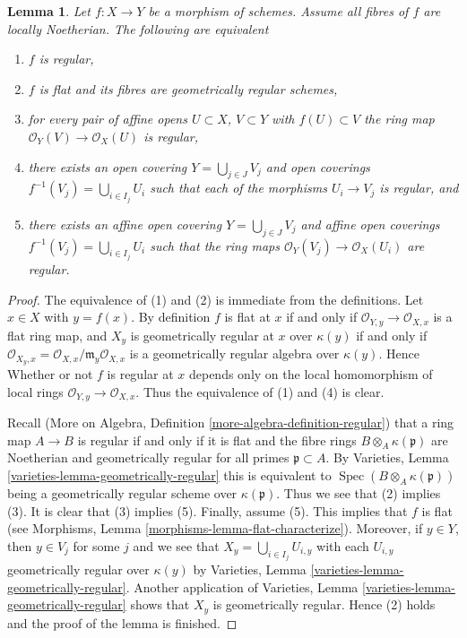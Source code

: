 \documentclass[10pt,a4paper]{amsart}
\theoremstyle{plain}
\newtheorem{lemma}[subsection]{Lemma}
\theoremstyle{definition}
\theoremstyle{remark}
\numberwithin{equation}{subsection}
\def\Spec{\mathop{\mathrm{Spec}}}
\begin{document}
\begin{lemma}
\label{lemma-regular}
Let $f : X \to Y$ be a morphism of schemes.
Assume all fibres of $f$ are locally Noetherian.
The following are equivalent
\begin{enumerate}
\item $f$ is regular,
\item $f$ is flat and its fibres are geometrically regular schemes,
\item for every pair of affine opens $U \subset X$, $V \subset Y$
with $f(U) \subset V$ the ring map $\mathcal{O}_Y(V) \to \mathcal{O}_X(U)$
is regular,
\item there exists an open covering $Y = \bigcup_{j \in J} V_j$
and open coverings $f^{-1}(V_j) = \bigcup_{i \in I_j} U_i$ such
that each of the morphisms $U_i \to V_j$ is regular, and
\item there exists an affine open covering $Y = \bigcup_{j \in J} V_j$
and affine open coverings $f^{-1}(V_j) = \bigcup_{i \in I_j} U_i$ such
that the ring maps $\mathcal{O}_Y(V_j) \to \mathcal{O}_X(U_i)$ are regular.
\end{enumerate}
\end{lemma}

\begin{proof}
The equivalence of (1) and (2) is immediate from the definitions.
Let $x \in X$ with $y = f(x)$. By definition $f$ is flat at $x$
if and only if $\mathcal{O}_{Y, y} \to \mathcal{O}_{X, x}$ is a
flat ring map, and $X_y$ is geometrically regular at $x$ over
$\kappa(y)$ if and only if
$\mathcal{O}_{X_y, x} = \mathcal{O}_{X, x}/\mathfrak m_y\mathcal{O}_{X, x}$
is a geometrically regular algebra over $\kappa(y)$. Hence
Whether or not $f$ is regular at $x$
depends only on the local homomorphism of local rings
$\mathcal{O}_{Y, y} \to \mathcal{O}_{X, x}$.
Thus the equivalence of (1) and (4) is clear.

\medskip\noindent
Recall (More on Algebra, Definition \ref{more-algebra-definition-regular})
that a ring map $A \to B$ is regular if and only if it is flat
and the fibre rings $B \otimes_A \kappa(\mathfrak p)$ are Noetherian
and geometrically regular for all primes $\mathfrak p \subset A$.
By Varieties, Lemma \ref{varieties-lemma-geometrically-regular}
this is equivalent to $\Spec(B \otimes_A \kappa(\mathfrak p))$
being a geometrically regular scheme over $\kappa(\mathfrak p)$.
Thus we see that (2) implies (3). It is clear that (3) implies
(5). Finally, assume (5). This implies that $f$ is flat
(see Morphisms, Lemma \ref{morphisms-lemma-flat-characterize}).
Moreover, if $y \in Y$, then $y \in V_j$ for some $j$ and we see
that $X_y = \bigcup_{i \in I_j} U_{i, y}$ with each $U_{i, y}$
geometrically regular over $\kappa(y)$ by
Varieties, Lemma \ref{varieties-lemma-geometrically-regular}.
Another application of
Varieties, Lemma \ref{varieties-lemma-geometrically-regular}
shows that $X_y$ is geometrically regular. Hence (2) holds
and the proof of the lemma is finished.
\end{proof}
\end{document}
